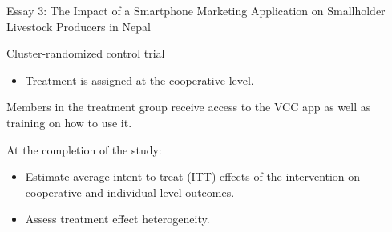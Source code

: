 \documentclass[aspectratio=169]{beamer}
\newenvironment{wideitemize}{\itemize\addtolength{\itemsep}{10pt}}{\enditemize}
\begin{document}
\begin{frame}{Essay 3: The Impact of a Smartphone Marketing Application on Smallholder Livestock Producers in Nepal}

    \begin{wideitemize}
        \item Cluster-randomized control trial \vspace{.25cm}
        \begin{itemize}
            \item Treatment is assigned at the cooperative level.
        \end{itemize}
        \item Members in the treatment group receive access to the VCC app as well as training on how to use it.
        \item At the completion of the study:
        \begin{itemize}
            \item Estimate average intent-to-treat (ITT) effects of the intervention on cooperative and individual level outcomes.
            \item Assess treatment effect heterogeneity.
        \end{itemize}
    \end{wideitemize}
\end{frame}
\end{document}
